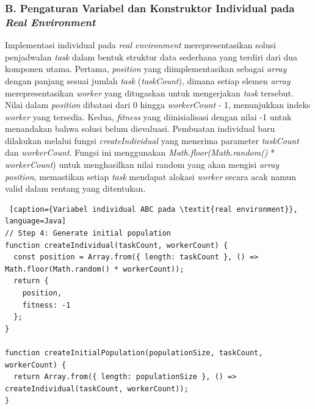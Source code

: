 \subsubsection{B. Pengaturan Variabel dan Konstruktor Individual pada \textit{Real Environment}}
Implementasi individual pada \textit{real environment} merepresentasikan solusi penjadwalan \textit{task} dalam bentuk struktur data sederhana yang terdiri dari dua komponen utama. Pertama, \textit{position} yang diimplementasikan sebagai \textit{array} dengan panjang sesuai jumlah \textit{task} (\textit{taskCount}), dimana setiap elemen \textit{array} merepresentasikan \textit{worker} yang ditugaskan untuk mengerjakan \textit{task} tersebut. Nilai dalam \textit{position} dibatasi dari 0 hingga \textit{workerCount} - 1, menunjukkan indeks \textit{worker} yang tersedia. Kedua, \textit{fitness} yang diinisialisasi dengan nilai -1 untuk menandakan bahwa solusi belum dievaluasi. Pembuatan individual baru dilakukan melalui fungsi \textit{createIndividual} yang menerima parameter \textit{taskCount} dan \textit{workerCount}. Fungsi ini menggunakan \textit{Math.floor(Math.random()} * \textit{workerCount}) untuk menghasilkan nilai random yang akan mengisi \textit{array position}, memastikan setiap \textit{task} mendapat alokasi \textit{worker} secara acak namun valid dalam rentang yang ditentukan.

\begin{lstlisting} [caption={Variabel individual ABC pada \textit{real environment}}, language=Java]
// Step 4: Generate initial population
function createIndividual(taskCount, workerCount) {
  const position = Array.from({ length: taskCount }, () => Math.floor(Math.random() * workerCount));
  return {
    position,
    fitness: -1
  };
}

function createInitialPopulation(populationSize, taskCount, workerCount) {
  return Array.from({ length: populationSize }, () => createIndividual(taskCount, workerCount));
}
\end{lstlisting}

